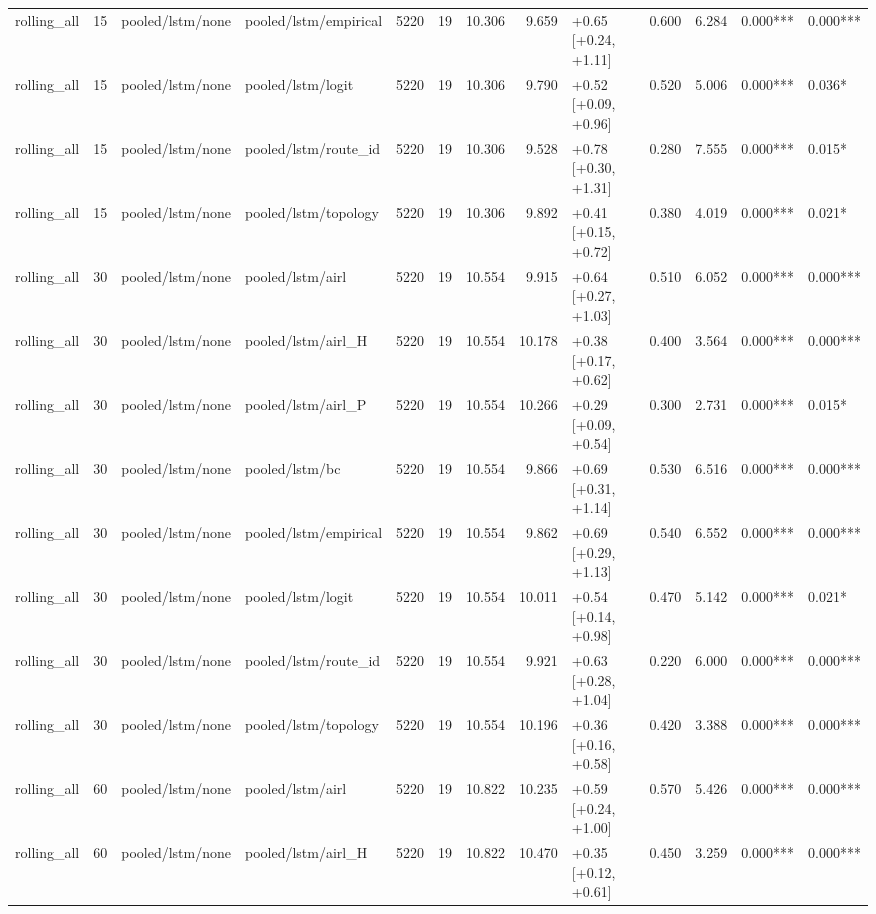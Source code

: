 \begin{tabular}{lrllrrrrlrrll}
rolling_all & 15 & pooled/lstm/none & pooled/lstm/empirical & 5220 & 19 & 10.306 & 9.659 & +0.65 [+0.24, +1.11] & 0.600 & 6.284 & 0.000*** & 0.000*** \\
rolling_all & 15 & pooled/lstm/none & pooled/lstm/logit & 5220 & 19 & 10.306 & 9.790 & +0.52 [+0.09, +0.96] & 0.520 & 5.006 & 0.000*** & 0.036* \\
rolling_all & 15 & pooled/lstm/none & pooled/lstm/route_id & 5220 & 19 & 10.306 & 9.528 & +0.78 [+0.30, +1.31] & 0.280 & 7.555 & 0.000*** & 0.015* \\
rolling_all & 15 & pooled/lstm/none & pooled/lstm/topology & 5220 & 19 & 10.306 & 9.892 & +0.41 [+0.15, +0.72] & 0.380 & 4.019 & 0.000*** & 0.021* \\
rolling_all & 30 & pooled/lstm/none & pooled/lstm/airl & 5220 & 19 & 10.554 & 9.915 & +0.64 [+0.27, +1.03] & 0.510 & 6.052 & 0.000*** & 0.000*** \\
rolling_all & 30 & pooled/lstm/none & pooled/lstm/airl_H & 5220 & 19 & 10.554 & 10.178 & +0.38 [+0.17, +0.62] & 0.400 & 3.564 & 0.000*** & 0.000*** \\
rolling_all & 30 & pooled/lstm/none & pooled/lstm/airl_P & 5220 & 19 & 10.554 & 10.266 & +0.29 [+0.09, +0.54] & 0.300 & 2.731 & 0.000*** & 0.015* \\
rolling_all & 30 & pooled/lstm/none & pooled/lstm/bc & 5220 & 19 & 10.554 & 9.866 & +0.69 [+0.31, +1.14] & 0.530 & 6.516 & 0.000*** & 0.000*** \\
rolling_all & 30 & pooled/lstm/none & pooled/lstm/empirical & 5220 & 19 & 10.554 & 9.862 & +0.69 [+0.29, +1.13] & 0.540 & 6.552 & 0.000*** & 0.000*** \\
rolling_all & 30 & pooled/lstm/none & pooled/lstm/logit & 5220 & 19 & 10.554 & 10.011 & +0.54 [+0.14, +0.98] & 0.470 & 5.142 & 0.000*** & 0.021* \\
rolling_all & 30 & pooled/lstm/none & pooled/lstm/route_id & 5220 & 19 & 10.554 & 9.921 & +0.63 [+0.28, +1.04] & 0.220 & 6.000 & 0.000*** & 0.000*** \\
rolling_all & 30 & pooled/lstm/none & pooled/lstm/topology & 5220 & 19 & 10.554 & 10.196 & +0.36 [+0.16, +0.58] & 0.420 & 3.388 & 0.000*** & 0.000*** \\
rolling_all & 60 & pooled/lstm/none & pooled/lstm/airl & 5220 & 19 & 10.822 & 10.235 & +0.59 [+0.24, +1.00] & 0.570 & 5.426 & 0.000*** & 0.000*** \\
rolling_all & 60 & pooled/lstm/none & pooled/lstm/airl_H & 5220 & 19 & 10.822 & 10.470 & +0.35 [+0.12, +0.61] & 0.450 & 3.259 & 0.000*** & 0.000*** \\

\end{tabular}
